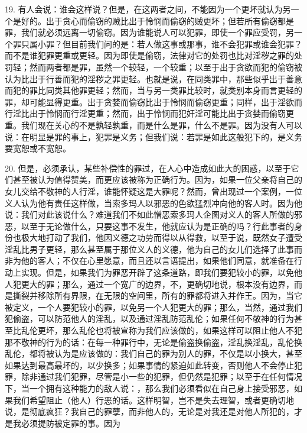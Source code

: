 19. 有人会说：谁会这样说？但是，在这两者之间，不能因为一个更坏就认为另一个是好的。出于贪心而偷窃的贼比出于怜悯而偷窃的贼更坏；但若所有偷窃都是罪，我们就必须远离一切偷窃。因为谁能说人可以犯罪，即使一个罪应受罚，另一个罪只属小罪？但目前我们问的是：若人做这事或那事，谁不会犯罪或谁会犯罪？而不是谁犯罪更重或更轻。因为即使是偷窃，法律对它的处罚也比对淫秽之罪的处罚轻；然而两者都是罪，虽然一个较轻，一个较重；以至于出于贪欲而犯的偷窃被认为比出于行善而犯的淫秽之罪更轻。也就是说，在同类罪中，那些似乎出于善意而犯的罪比同类其他罪更轻；然而，当与另一类罪比较时，就类别本身而言更轻的罪，却可能显得更重。出于贪婪而偷窃比出于怜悯而偷窃更重；同样，出于淫欲而行淫比出于怜悯而行淫更重；然而，出于怜悯而犯奸淫可能比出于贪婪而偷窃更重。我们现在关心的不是孰轻孰重，而是什么是罪，什么不是罪。因为没有人可以说：在明显是罪的事上，犯罪是义务；但我们说：若罪是如此这般犯下的，是义务要宽恕或不宽恕。\par

20. 但是，必须承认，某些补偿性的罪过，在人心中造成如此大的困惑，以至于它们甚至被认为值得赞美，而更应该被称为正确行为。因为，如果一位父亲将自己的女儿交给不敬神的人行淫，谁能怀疑这是大罪呢？然而，曾出现过一个案例，一位义人认为他有责任这样做，当索多玛人以邪恶的色欲猛烈冲向他的客人时。因为他说：我们对此该说什么？难道我们不如此憎恶索多玛人企图对义人的客人所做的邪恶，以至于无论做什么，只要这事不发生，他就应认为是正确的吗？行此事者的身份也极大地打动了我们，他因义德之功劳而得以从得救，以至于说，既然女子遭受淫乱比男子更轻，那么甚至属于那位义人的义德，他为自己的女儿们选择了此事而非为他的客人；不仅在心里愿意，而且还以言语提出，如果他们同意，就准备在行动上实现。但是，如果我们为罪恶开辟了这条道路，即我们要犯较小的罪，以免他人犯更大的罪；那么，通过一个宽广的边界，不，更确切地说，根本没有边界，而是撕裂并移除所有界限，在无限的空间里，所有的罪都将进入并作王。因为，当它被定义，一个人要犯较小的罪，以免另一个人犯更大的罪；那么，当然，通过我们犯偷盗，可以防范他人的淫乱，以及通过淫乱防范乱伦；如果任何不敬神的行为甚至比乱伦更坏，那么乱伦也将被宣称为我们应该做的，如果这样可以阻止他人不犯那不敬神的行为的话：在每一种罪行中，无论是偷盗换偷盗，淫乱换淫乱，乱伦换乱伦，都将被认为是应该做的：我们自己的罪为别人的罪，不仅是以小换大，甚至如果达到最高最坏的，以少换多；如果事情的紧迫如此转变，否则他人不会停止犯罪，除非通过我们犯罪，尽管是小一些的犯罪，但仍然是犯罪；以至于在任何情况下，当一个拥有这种能力的敌人说：，那么我们必须看似在自己身上接受邪恶，如果我们希望阻止（他人）行恶的话。这样明智，岂不是失去理智，或者更确切地说，是彻底疯狂？我自己的罪孽，而非他人的，无论是对我还是对他人所犯的，才是我必须提防被定罪的事。因为\par

